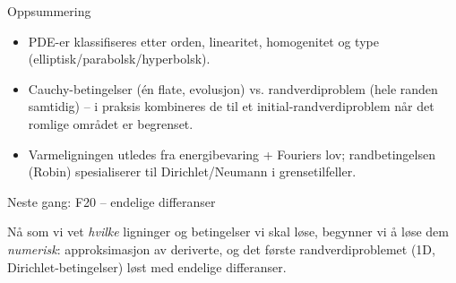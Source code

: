 \documentclass[11pt,aspectratio=169]{beamer}
\begin{document}
\begin{frame}{Oppsummering}
\begin{itemize}
\item PDE-er klassifiseres etter orden, linearitet, homogenitet og type (elliptisk/parabolsk/hyperbolsk).
\item Cauchy-betingelser (én flate, evolusjon) vs. randverdiproblem (hele randen samtidig) -- i praksis kombineres de til et initial-randverdiproblem når det romlige området er begrenset.
\item Varmeligningen utledes fra energibevaring + Fouriers lov; randbetingelsen (Robin) spesialiserer til Dirichlet/Neumann i grensetilfeller.
\end{itemize}
\end{frame}

\begin{frame}{Neste gang: F20 -- endelige differanser}
\begin{nestefb}
Nå som vi vet \emph{hvilke} ligninger og betingelser vi skal løse, begynner vi å løse dem \emph{numerisk}: approksimasjon av deriverte, og det første randverdiproblemet (1D, Dirichlet-betingelser) løst med endelige differanser.
\end{nestefb}
\end{frame}
\end{document}
